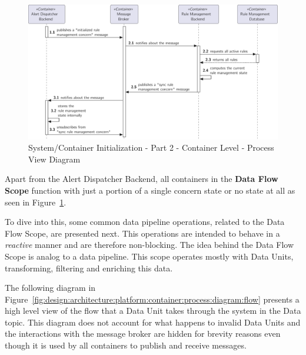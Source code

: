 \begin{figure}[H]
   \centering
   \includegraphics[page=1,width=\columnwidth]{assets/diagrams/design/architectural/level2/process/container-ready.pdf}
   \caption[System/Container Initialization - Part 2 - Container Level - Process View Diagram]{System/Container Initialization - Part 2 - Container Level - Process View Diagram}
   \label{fig:design:architecture:platform:container:process:diagram:ready}
\end{figure}

Apart from the Alert Dispatcher Backend, all containers in the \textbf{Data Flow Scope} function with just a portion of a single concern state or no state at all as seen in Figure~\ref{fig:design:architecture:platform:container:process:diagram:ready}.

To dive into this, some common data pipeline operations, related to the Data Flow Scope, are presented next. This operations are intended to behave in a \textit{reactive} manner \parencite{reactivemanifesto} and are therefore non-blocking. The idea behind the Data Flow Scope is analog to a data pipeline. This scope operates mostly with Data Units, transforming, filtering and enriching this data.

The following diagram in Figure~\ref{fig:design:architecture:platform:container:process:diagram:flow} presents a high level view of the flow that a Data Unit takes through the system in the Data topic. This diagram does not account for what happens to invalid Data Units and the interactions with the message broker are hidden for brevity reasons even though it is used by all containers to publish and receive messages.


